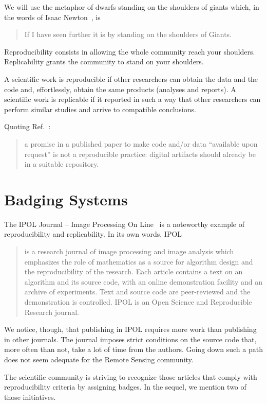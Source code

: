 \documentclass[journal,twoside]{IEEEtran}
\begin{document}
We will use the metaphor of dwarfs standing on the shoulders of giants which, in the words of Isaac Newton~\cite{LetterNewton}, is
\begin{quote}
	If I have seen further it is by standing on the shoulders of Giants.
\end{quote}
Reproducibility consists in allowing the whole community reach your shoulders.
Replicability grants the community to stand on your shoulders.

A scientific work is reproducible if other researchers can obtain the data and the code and, effortlessly, obtain the same products (analyses and reports).
A scientific work is replicable if it reported in such a way that other researchers can perform similar studies and arrive to compatible conclusions.

Quoting Ref.~\cite{PraxisofReproducibleComputationalScience}:
\begin{quote}
	a promise in a published paper
	to make code and/or data ``available upon
	request'' is not a reproducible practice: digital
	artifacts should already be in a suitable repository.
\end{quote}


\section{Badging Systems}

The IPOL Journal -- Image Processing On Line~\cite{IPOL} is a noteworthy example of reproducibility and replicability.
In its own words, IPOL
\begin{quote}
is a research journal of image processing and image analysis which emphasizes the role of mathematics as a source for algorithm design and the reproducibility of the research. Each article contains a text on an algorithm and its source code, with an online demonstration facility and an archive of experiments. Text and source code are peer-reviewed and the demonstration is controlled. IPOL is an Open Science and Reproducible Research journal.
\end{quote}

We notice, though, that publishing in IPOL requires more work than publishing in other journals. 
The journal imposes strict conditions on the source code that, more often than not, take a lot of time from the authors.
Going down such a path does not seem adequate for the Remote Sensing community.

The scientific community is striving to recognize those articles that comply with reproducibility criteria by assigning badges.
In the sequel, we mention two of those initiatives.
\end{document}
